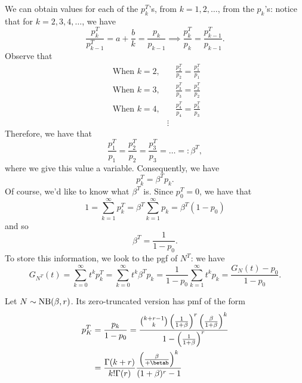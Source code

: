 \documentclass[notoc,notitlepage]{tufte-book}
\begin{document}
We can obtain values for each of the $p_k^T$'s, from $k = 1, 2, \ldots$, from the $p_k$'s: notice that for $k = 2, 3, 4, \ldots$, we have
\begin{equation*}
  \frac{p_k^T}{p_{k - 1}^T} = a + \frac{b}{k} = \frac{p_k}{p_{k - 1}} \implies \frac{p_k^T}{p_k} = \frac{p_{k - 1}^T}{p_{k - 1}}.
\end{equation*}
Observe that
\begin{align*}
  \text{ When } k = 2, &\quad \frac{p_2^T}{p_2} = \frac{p_1^T}{p_1} \\
  \text{ When } k = 3, &\quad \frac{p_3^T}{p_3} = \frac{p_2^T}{p_2} \\
  \text{ When } k = 4, &\quad \frac{p_4^T}{p_4} = \frac{p_3^T}{p_3} \\
                       &\vdots
\end{align*}
Therefore, we have that
\begin{equation*}
  \frac{p_1^T}{p_1} = \frac{p_2^T}{p_2} = \frac{p_3^T}{p_3} = \hdots =: \beta^T,
\end{equation*}
where we give this value a variable. Consequently, we have
\begin{equation*}
  p_k^T = \beta^T p_k.
\end{equation*}
Of course, we'd like to know what $\beta^T$ is. Since $p_0^T = 0$, we have that
\begin{equation*}
  1 = \sum_{k=1}^{\infty} p_k^T = \beta^T \sum_{k=1}^{\infty} p_k = \beta^T ( 1 - p_0 )
\end{equation*}
and so
\begin{equation*}
  \beta^T = \frac{1}{1 - p_0}.
\end{equation*}
To store this information, we look to the pgf of $N^T$: we have
\begin{equation*}
  G_{N^T}(t) = \sum_{k=0}^{\infty} t^k p_{k}^T= \sum_{k=0}^{\infty} t^k \beta^T p_k = \frac{1}{1 - p_0} \sum_{k=1}^{\infty} t^k p_k = \frac{G_N(t) - p_0}{1 - p_0}.
\end{equation*}

\begin{eg}
  Let $N \sim \operatorname{NB}(\beta, r)$. Its zero-truncated version has pmf of the form
  \begin{align*}
    p_K^T &= \frac{p_k}{1 - p_0} = \frac{\binom{k + r - 1}{k} \left( \frac{1}{1 + \beta} \right)^r \left( \frac{\beta}{1 + \beta} \right)^k}{1 - \left( \frac{1}{1 + \beta} \right)^r} \\
          &= \frac{\Gamma(k + r)}{k! \Gamma(r)} \frac{\left( \frac{\beta}{ + \betab} \right)^k}{(1 + \beta)^r - 1}
  \end{align*}
\end{eg}
\end{document}
